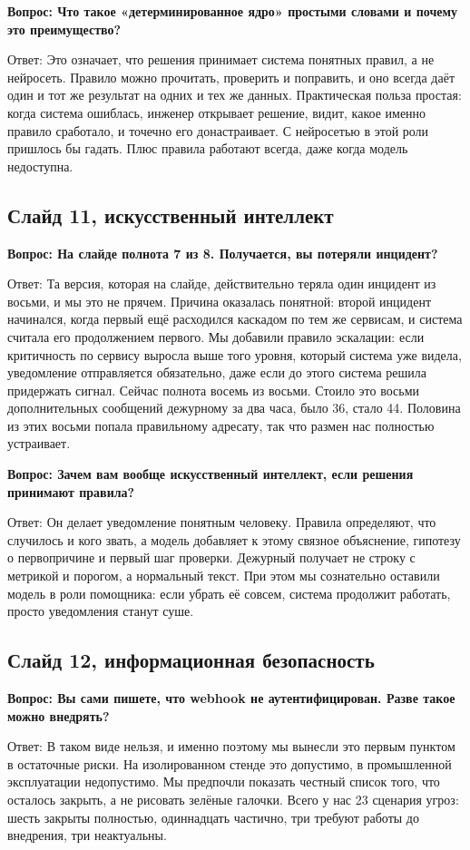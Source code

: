 \documentclass[11pt]{article}
\newcommand{\qa}[2]{%
\par\vspace{7pt}%
{\bfseries Вопрос: #1}\par\vspace{2pt}
{Ответ: #2}\par\vspace{4pt}}
\begin{document}
\qa{Что такое «детерминированное ядро» простыми словами и почему это
преимущество?}
{Это означает, что решения принимает система понятных правил, а не нейросеть.
Правило можно прочитать, проверить и поправить, и оно всегда даёт один и тот
же результат на одних и тех же данных. Практическая польза простая: когда
система ошиблась, инженер открывает решение, видит, какое именно правило
сработало, и точечно его донастраивает. С нейросетью в этой роли пришлось бы
гадать. Плюс правила работают всегда, даже когда модель недоступна.}

\subsection{Слайд 11, искусственный интеллект}

\qa{На слайде полнота 7 из 8. Получается, вы потеряли инцидент?}
{Та версия, которая на слайде, действительно теряла один инцидент из восьми, и
мы это не прячем. Причина оказалась понятной: второй инцидент начинался, когда
первый ещё расходился каскадом по тем же сервисам, и система считала его
продолжением первого. Мы добавили правило эскалации: если критичность по сервису
выросла выше того уровня, который система уже видела, уведомление отправляется
обязательно, даже если до этого система решила придержать сигнал. Сейчас
полнота восемь из восьми. Стоило это восьми дополнительных сообщений дежурному
за два часа, было 36, стало 44. Половина из этих восьми попала правильному
адресату, так что размен нас полностью устраивает.}

\qa{Зачем вам вообще искусственный интеллект, если решения принимают правила?}
{Он делает уведомление понятным человеку. Правила определяют, что случилось и
кого звать, а модель добавляет к этому связное объяснение, гипотезу о
первопричине и первый шаг проверки. Дежурный получает не строку с метрикой и
порогом, а нормальный текст. При этом мы сознательно оставили модель в роли
помощника: если убрать её совсем, система продолжит работать, просто
уведомления станут суше.}

\subsection{Слайд 12, информационная безопасность}

\qa{Вы сами пишете, что webhook не аутентифицирован. Разве такое можно
внедрять?}
{В таком виде нельзя, и именно поэтому мы вынесли это первым пунктом в
остаточные риски. На изолированном стенде это допустимо, в промышленной
эксплуатации недопустимо. Мы предпочли показать честный список того, что
осталось закрыть, а не рисовать зелёные галочки. Всего у нас 23 сценария
угроз: шесть закрыты полностью, одиннадцать частично, три требуют работы до
внедрения, три неактуальны.}
\end{document}
